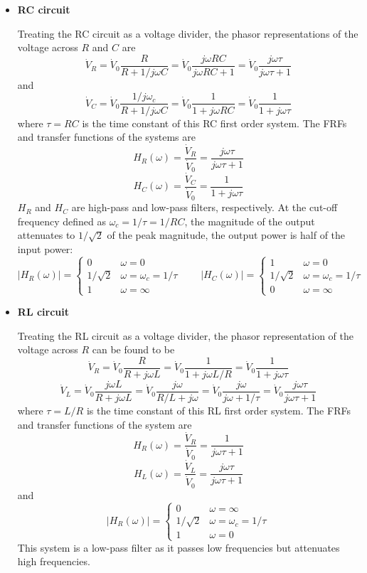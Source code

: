 \begin{itemize}
\item {\bf RC circuit} 

  Treating the RC circuit as a voltage divider, the phasor representations of
  the voltage across $R$ and $C$ are
  \[
  \dot{V}_R=\dot{V}_0\frac{R}{R+1/j\omega C}=\dot{V}_0\frac{j\omega RC}{j\omega RC+1}
  =\dot{V}_0\frac{j\omega\tau}{j\omega\tau+1}
  \]
  and
  \[
  \dot{V}_C=\dot{V}_0\frac{1/j\omega_c}{R+1/j\omega C}
  =\dot{V}_0\frac{1}{1+j\omega RC}=\dot{V}_0\frac{1}{1+j\omega\tau}
  \]
  where $\tau=RC$ is the time constant of this RC first order system. The 
  FRFs and transfer functions of the systems are
  \[ 
  H_R(\omega)=\frac{\dot{V}_R}{\dot{V}_0}=\frac{j\omega\tau}{j\omega\tau+1}
  \]
  \[ 
  H_C(\omega)=\frac{\dot{V}_C}{\dot{V}_0}=\frac{1}{1+j\omega\tau}
  \]
  $H_R$ and $H_C$ are high-pass and low-pass filters, respectively. At the 
  cut-off frequency defined as $\omega_c=1/\tau=1/RC$, the magnitude of the 
  output attenuates to $1/\sqrt{2}$ of the peak magnitude, the output power 
  is half of the input power:
  \[
  |H_R(\omega)|=\left\{\begin{array}{cl}0&\omega=0\\
  1/\sqrt{2}&\omega=\omega_c=1/\tau\\1&\omega=\infty\end{array}\right.
  \;\;\;\;\;\;\;
  |H_C(\omega)|=\left\{\begin{array}{cl}1&\omega=0\\
  1/\sqrt{2}&\omega=\omega_c=1/\tau\\0&\omega=\infty\end{array}\right.
  \]

\item {\bf RL circuit}

  Treating the RL circuit as a voltage divider, the phasor representation of
  the voltage across $R$ can be found to be
  \[
  \dot{V}_R=\dot{V}_0\frac{R}{R+j\omega L}
  =\dot{V}_0\frac{1}{1+j\omega L/R}=\dot{V}_0\frac{1}{1+j\omega\tau}
  \]
  \[
  \dot{V}_L=\dot{V}_0\frac{j\omega L}{R+j\omega L}
  =\dot{V}_0\frac{j\omega}{R/L+j\omega}=\dot{V}_0\frac{j\omega}{j\omega+1/\tau}
  =\dot{V}_0\frac{j\omega\tau}{j\omega\tau+1}
  \]
  where $\tau=L/R$ is the time constant of this RL first order system. The 
  FRFs and transfer functions of the system are
  \[ 
  H_R(\omega)=\frac{\dot{V}_R}{\dot{V}_0}=\frac{1}{j\omega\tau+1}
  \]
  \[
  H_L(\omega)=\frac{\dot{V}_L}{\dot{V}_0}=\frac{j\omega\tau}{j\omega\tau+1}
  \]
  and
  \[
  |H_R(\omega)|=\left\{\begin{array}{cl}0&\omega=\infty\\
  1/\sqrt{2}&\omega=\omega_c=1/\tau\\1&\omega=0\end{array}\right.
  \]
  This system is a low-pass filter as it passes low frequencies but 
  attenuates high frequencies. 

\end{itemize}

